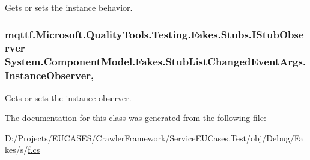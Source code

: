 Gets or sets the instance behavior.

\hypertarget{class_system_1_1_component_model_1_1_fakes_1_1_stub_list_changed_event_args_ae47785a84fa874fe08e22627ad13d1c6}{
\subsubsection[{Instance\-Observer}]{\setlength{\rightskip}{0pt plus 5cm}mqttf.\-Microsoft.\-Quality\-Tools.\-Testing.\-Fakes.\-Stubs.\-I\-Stub\-Observer System.\-Component\-Model.\-Fakes.\-Stub\-List\-Changed\-Event\-Args.\-Instance\-Observer\hspace{0.3cm}{\ttfamily [get]}, {\ttfamily [set]}}}\label{class_system_1_1_component_model_1_1_fakes_1_1_stub_list_changed_event_args_ae47785a84fa874fe08e22627ad13d1c6}


Gets or sets the instance observer.



The documentation for this class was generated from the following file\-:\begin{DoxyCompactItemize}
\item 
D\-:/\-Projects/\-E\-U\-C\-A\-S\-E\-S/\-Crawler\-Framework/\-Service\-E\-U\-Cases.\-Test/obj/\-Debug/\-Fakes/s/\hyperlink{s_2f_8cs}{f.\-cs}\end{DoxyCompactItemize}
